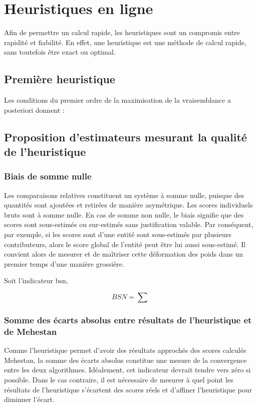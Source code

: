 \section{Heuristiques en ligne}
Afin de permettre un calcul rapide, les heuristiques sont un compromis entre rapidité et fiabilité. En effet, une heuristique est une méthode de calcul rapide, sans toutefois être exact ou optimal.

\subsection{Première heuristique}

Les conditions du premier ordre de la maximisation de la vraisemblance a posteriori donnent :


\subsection{Proposition d'estimateurs mesurant la qualité de l'heuristique}


\subsubsection{Biais de somme nulle}

Les comparaisons relatives constituent un système à somme nulle, puisque des quantités sont ajoutées et retirées de manière asymétrique. Les scores individuels bruts sont à somme nulle. En cas de somme non nulle, le biais signifie que des scores sont sous-estimés ou sur-estimés sans justification valable. Par conséquent, par exemple, si les scores sont d'une entité sont sous-estimés par plusieurs contributeurs, alors le score global de l'entité peut être lui aussi sous-estimé. Il convient alors de mesurer et de maîtriser cette déformation des poids dans un premier temps d'une manière grossière.

Soit l'indicateur \gls{bsn},

\begin{equation}
BSN= \sum
\end{equation}


\subsubsection{Somme des écarts absolus entre résultats de l'heuristique et de Mehestan}

Comme l'heuristique permet d'avoir des résultats approchés des scores calculés Mehestan, la somme des écarts absolus constitue une mesure de la convergence entre les deux algorithmes. Idéalement, cet indicateur devrait tendre vers zéro si possible. Dans le cas contraire, il est nécessaire de mesurer à quel point les résultats de l'heuristique s'écartent des scores réels et d'affiner l'heuristique pour diminuer l'écart.

